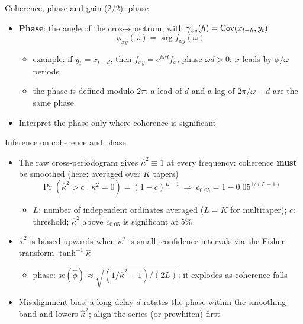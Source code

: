 \begin{frame}{Coherence, phase and gain (2/2): phase}
\itemsize{\small}
\begin{itemize}
    \item \textbf{Phase}: the angle of the cross-spectrum, with $\gamma_{xy}(h) = \text{Cov}(x_{t+h}, y_t)$
    \[ \phi_{xy}(\omega) = \arg f_{xy}(\omega) \]
    \begin{itemize}
        \item example: if $y_t = x_{t-d}$, then $f_{xy} = e^{i\omega d}f_x$, phase $\omega d > 0$: $x$ leads by $\phi/\omega$ periods
        \item the phase is defined modulo $2\pi$: a lead of $d$ and a lag of $2\pi/\omega - d$ are the same phase
    \end{itemize}
    \item Interpret the phase only where coherence is significant
\end{itemize}
\end{frame}

\begin{frame}{Inference on coherence and phase}
\itemsize{\small}
\begin{itemize}
    \item The raw cross-periodogram gives $\hat\kappa^2 \equiv 1$ at every frequency: coherence \textbf{must} be smoothed (here: averaged over $K$ tapers)
    \[ \Pr(\hat\kappa^2 > c \mid \kappa^2 = 0) = (1 - c)^{L-1} \ \Rightarrow\ c_{0.05} = 1 - 0.05^{1/(L-1)} \]
    \begin{itemize}
        \item $L$: number of independent ordinates averaged ($L = K$ for multitaper); $c$: threshold; $\hat\kappa^2$ above $c_{0.05}$ is significant at 5\%
    \end{itemize}
    \item $\hat\kappa^2$ is biased upwards when $\kappa^2$ is small; confidence intervals via the Fisher transform $\tanh^{-1}\hat\kappa$ 
    \begin{itemize}
        \item phase: $\mathrm{se}(\hat\phi) \approx \sqrt{(1/\hat\kappa^2 - 1)/(2L)}$; it explodes as coherence falls
    \end{itemize}
    \item Misalignment bias: a long delay $d$ rotates the phase within the smoothing band and lowers $\hat\kappa^2$; align the series (or prewhiten) first
\end{itemize}
\end{frame}

